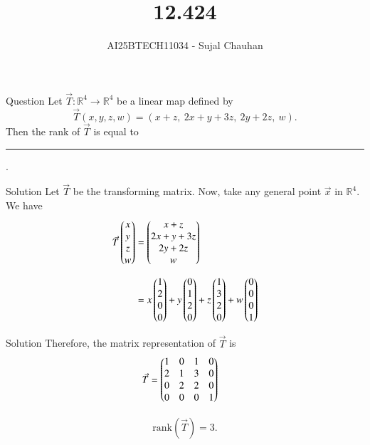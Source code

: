 \documentclass{beamer}
\title
{12.424}
\author 
{AI25BTECH11034 - Sujal Chauhan }
\begin{document}
\frame{\titlepage}
\begin{frame}{Question}
Let $\Vec{T} : \mathbb{R}^4 \to \mathbb{R}^4$ be a linear map defined by
\[
\Vec{T}(x, y, z, w) = (x + z,\ 2x + y + 3z,\ 2y + 2z,\ w).
\]
Then the rank of $\Vec{T}$ is equal to \rule{2cm}{0.15mm}.


\end{frame}
\begin{frame}{Solution}
    Let $\Vec{T}$ be the transforming matrix.  
    Now, take any general point $\Vec{x}$ in $\mathbb{R}^4$. We have
    \begin{align}
        \Vec{T}\begin{pmatrix}x\\y\\z\\w\end{pmatrix} 
        &= \begin{pmatrix}x + z\\ 2x + y + 3z\\ 2y + 2z\\ w\end{pmatrix} \\[6pt]
        &= x\begin{pmatrix}1\\2\\0\\0\end{pmatrix} 
         + y\begin{pmatrix}0\\1\\2\\0\end{pmatrix} 
         + z\begin{pmatrix}1\\3\\2\\0\end{pmatrix} 
         + w\begin{pmatrix}0\\0\\0\\1\end{pmatrix}
    \end{align}
\end{frame}
\begin{frame}{Solution}
    Therefore, the matrix representation of $\Vec{T}$ is
    \begin{align}
        \Vec{T} 
        &= \begin{pmatrix}
        1 & 0 & 1 & 0\\
        2 & 1 & 3 & 0\\
        0 & 2 & 2 & 0\\
        0 & 0 & 0 & 1\end{pmatrix}
    \end{align}

    
    \begin{align}
        \boxed{\text{rank}(\Vec{T}) = 3.}
    \end{align}
\end{frame}
\end{document}

